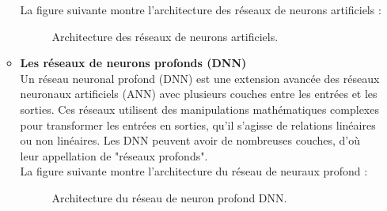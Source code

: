 \documentclass{report}
\begin{document}
\begin{itemize}
\begin{itemize}
La figure suivante montre l’architecture des réseaux de neurons artificiels \cite{web 7 : blog.sinatechnologie.com} :
\begin{figure}[h]
        \centering
        \caption{Architecture des réseaux de neurons artificiels.\cite{web 7 : blog.sinatechnologie.com} }
        \label{g}
    \end{figure}
\newpage
\item \textbf{ Les réseaux de neurons profonds (DNN)}  \\
Un réseau neuronal profond (DNN) est une extension avancée des réseaux neuronaux artificiels (ANN) avec plusieurs couches entre les entrées et les sorties. Ces réseaux utilisent des manipulations mathématiques complexes pour transformer les entrées en sorties, qu'il s'agisse de relations linéaires ou non linéaires. Les DNN peuvent avoir de nombreuses couches, d'où leur appellation de "réseaux profonds". \\

La figure suivante montre l’architecture du réseau de neuraux profond \cite{web 7 : blog.sinatechnologie.com} :
\begin{figure}[h]
        \centering
        \caption{Architecture du réseau de neuron profond  DNN.\cite{web 7 : blog.sinatechnologie.com} }
        \label{g}
    \end{figure}

\end{itemize}

\end{itemize}
\end{document}
